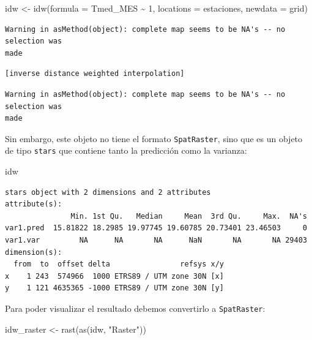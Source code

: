 \documentclass[
  letterpaper,
  DIV=11,
  numbers=noendperiod]{scrreprt}
\newenvironment{Shaded}{\begin{snugshade}}{\end{snugshade}}
\newcommand{\AttributeTok}[1]{\textcolor[rgb]{0.40,0.45,0.13}{#1}}
\newcommand{\DecValTok}[1]{\textcolor[rgb]{0.68,0.00,0.00}{#1}}
\newcommand{\FunctionTok}[1]{\textcolor[rgb]{0.28,0.35,0.67}{#1}}
\newcommand{\NormalTok}[1]{\textcolor[rgb]{0.00,0.23,0.31}{#1}}
\newcommand{\OtherTok}[1]{\textcolor[rgb]{0.00,0.23,0.31}{#1}}
\newcommand{\SpecialCharTok}[1]{\textcolor[rgb]{0.37,0.37,0.37}{#1}}
\newcommand{\StringTok}[1]{\textcolor[rgb]{0.13,0.47,0.30}{#1}}
\begin{document}
\begin{Shaded}
\begin{Highlighting}[]
\NormalTok{idw }\OtherTok{\textless{}{-}} \FunctionTok{idw}\NormalTok{(}\AttributeTok{formula =}\NormalTok{ Tmed\_MES }\SpecialCharTok{\textasciitilde{}} \DecValTok{1}\NormalTok{, }\AttributeTok{locations =}\NormalTok{ estaciones, }\AttributeTok{newdata =}\NormalTok{ grid)}
\end{Highlighting}
\end{Shaded}

\begin{verbatim}
Warning in asMethod(object): complete map seems to be NA's -- no selection was
made
\end{verbatim}

\begin{verbatim}
[inverse distance weighted interpolation]
\end{verbatim}

\begin{verbatim}
Warning in asMethod(object): complete map seems to be NA's -- no selection was
made
\end{verbatim}

Sin embargo, este objeto no tiene el formato \texttt{SpatRaster}, sino
que es un objeto de tipo \texttt{stars} que contiene tanto la predicción
como la varianza:

\begin{Shaded}
\begin{Highlighting}[]
\NormalTok{idw}
\end{Highlighting}
\end{Shaded}

\begin{verbatim}
stars object with 2 dimensions and 2 attributes
attribute(s):
               Min. 1st Qu.   Median     Mean  3rd Qu.     Max.  NA's
var1.pred  15.81822 18.2985 19.97745 19.60785 20.73401 23.46503     0
var1.var         NA      NA       NA      NaN       NA       NA 29403
dimension(s):
  from  to  offset delta                refsys x/y
x    1 243  574966  1000 ETRS89 / UTM zone 30N [x]
y    1 121 4635365 -1000 ETRS89 / UTM zone 30N [y]
\end{verbatim}

Para poder visualizar el resultado debemos convertirlo a
\texttt{SpatRaster}:

\begin{Shaded}
\begin{Highlighting}[]
\NormalTok{idw\_raster }\OtherTok{\textless{}{-}} \FunctionTok{rast}\NormalTok{(}\FunctionTok{as}\NormalTok{(idw, }\StringTok{"Raster"}\NormalTok{))}
\end{Highlighting}
\end{Shaded}
\end{document}
